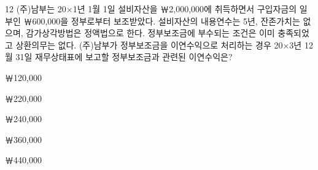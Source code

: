 \begin{question}{12}
(주)남부는 20×1년 1월 1일 설비자산을 ￦2,000,000에 취득하면서 구입자금의 일부인 ￦600,000을 정부로부터 보조받았다. 설비자산의 내용연수는 5년, 잔존가치는 없으며, 감가상각방법은 정액법으로 한다. 정부보조금에 부수되는 조건은 이미 충족되었고 상환의무는 없다. (주)남부가 정부보조금을 이연수익으로 처리하는 경우 20×3년 12월 31일 재무상태표에 보고할 정부보조금과 관련된 이연수익은?
\begin{choices}
  \item ￦120,000
  \item ￦220,000
  \item ￦240,000
  \item ￦360,000
  \item ￦440,000
\end{choices}
\end{question}
